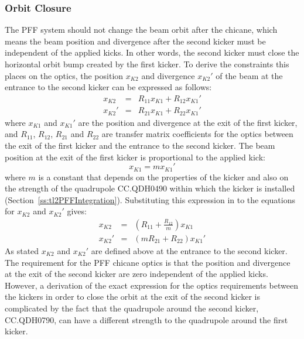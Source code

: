\subsubsection{Orbit Closure}

The PFF system should not change the beam orbit after the chicane, which means the beam position and divergence after the second kicker must be independent of the applied kicks. In other words, the second kicker must close the horizontal orbit bump created by the first kicker. 
To derive the constraints this places on the optics, the position \(x_{K2}\) and divergence \(x_{K2}'\) of the beam at the entrance to the second kicker can be expressed as follows:
\begin{eqnarray}
x_{K2} &=& R_{11}x_{K1} + R_{12}x_{K1}' \\
x_{K2}' &=& R_{21}x_{K1} + R_{22}x_{K1}'
\end{eqnarray}
where \(x_{K1}\) and \(x_{K1}'\) are the position and divergence at the exit of the first kicker, and \(R_{11}\), \(R_{12}\), \(R_{21}\) and \(R_{22}\) are transfer matrix coefficients for the optics between the exit of the first kicker and the entrance to the second kicker. The beam position at the exit of the first kicker is proportional to the applied kick:
\begin{equation}
x_{K1} = m x_{K1}'
\end{equation}
where \(m\) is a constant that depends on the properties of the kicker and also on the strength of the quadrupole CC.QDH0490 within which the kicker is installed (Section~\ref{ss:tl2PFFIntegration}). Substituting this expression in to the equations for \(x_{K2}\) and \(x_{K2}'\) gives:
\begin{eqnarray}
x_{K2} &=& \left(R_{11} + \frac{R_{12}}{m}\right)x_{K1} \\
x_{K2}' &=& (m R_{21} + R_{22})x_{K1}'
\end{eqnarray}
As stated \(x_{K2}\) and \(x_{K2}'\) are defined above at the entrance to the second kicker. The requirement for the PFF chicane optics is that the position and divergence at the exit of the second kicker are zero independent of the applied kicks. However, a derivation of the exact expression for the optics requirements between the kickers in order to close the orbit at the exit of the second kicker is complicated by the fact that the quadrupole around the second kicker, CC.QDH0790, can have a different strength to the quadrupole around the first kicker. 


